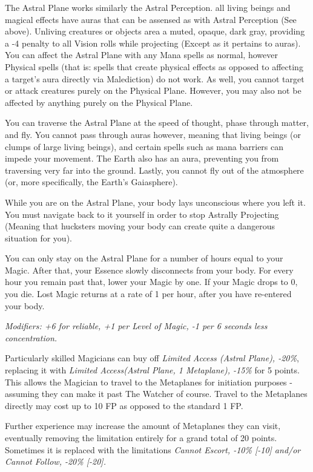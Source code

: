 \begin{multicols}{3}
	The Astral Plane works similarly the Astral Perception. all living beings and magical effects have auras that can be assensed as with Astral Perception (See above). Unliving creatures or objects area a muted, opaque, dark gray, providing a -4 penalty to all Vision rolls while projecting (Except as it pertains to auras). You can affect the Astral Plane with any Mana spells as normal, however Physical spells (that is: spells that create physical effects as opposed to affecting a target's aura directly via Malediction) do not work. As well, you cannot target or attack creatures purely on the Physical Plane. However, you may also not be affected by anything purely on the Physical Plane.
	
	You can traverse the Astral Plane at the speed of thought, phase through matter, and fly. You cannot pass through auras however, meaning that living beings (or clumps of large living beings), and certain spells such as mana barriers can impede your movement. The Earth also has an aura, preventing you from traversing very far into the ground. Lastly, you cannot fly out of the atmosphere (or, more specifically, the Earth's Gaiasphere).
	
	While you are on the Astral Plane, your body lays unconscious where you left it. You must navigate back to it yourself in order to stop Astrally Projecting (Meaning that hucksters moving your body can create quite a dangerous situation for you).
	
	You can only stay on the Astral Plane for a number of hours equal to your Magic. After that, your Essence slowly disconnects from your body. For every hour you remain past that, lower your Magic by one. If your Magic drops to 0, you die. Lost Magic returns at a rate of 1 per hour, after you have re-entered your body.
	
	\textit{\textcolor{NavyBlue}{Modifiers: +6 for reliable, +1 per Level of Magic, -1 per 6 seconds less concentration.}}
	
	Particularly skilled Magicians can buy off \textit{Limited Access (Astral Plane), -20\%}, replacing it with \textit{Limited Access(Astral Plane, 1 Metaplane), -15\%} for 5 points. This allows the Magician to travel to the Metaplanes for initiation purposes - assuming they can make it past The Watcher of course. Travel to the Metaplanes directly may cost up to 10 FP as opposed to the standard 1 FP. 
	
	Further experience may increase the amount of Metaplanes they can visit, eventually removing the limitation entirely for a grand total of 20 points. Sometimes it is replaced with the limitations \textit{Cannot Escort, -10\% [-10] and/or Cannot Follow, -20\% [-20].}
	

\end{multicols}
